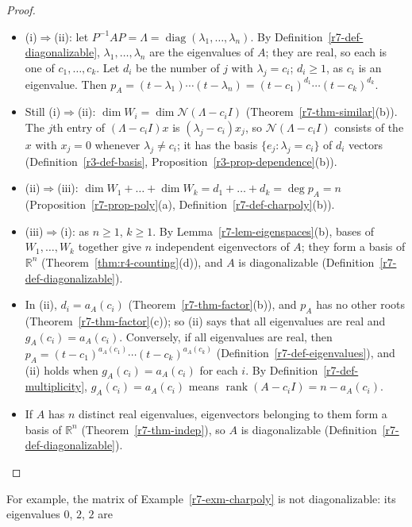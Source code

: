 \documentclass[12pt]{article}
\newcommand{\R}{\mathbb R}
\DeclareMathOperator{\diag}{diag}
\DeclareMathOperator{\rank}{rank}
\theoremstyle{definition}
\begin{document}
\begin{proof}
\begin{itemize}
\item (i)\(\Rightarrow\)(ii): let \(P^{-1}AP=\Lambda=\diag(\lambda_1,\dots,\lambda_n)\). By
Definition~\ref{r7-def-diagonalizable}, \(\lambda_1,\dots,\lambda_n\) are the eigenvalues of \(A\); they are real, so each is
one of \(c_1,\dots,c_k\). Let \(d_i\) be the number of \(j\) with \(\lambda_j=c_i\); \(d_i\geqslant1\), as \(c_i\) is an
eigenvalue. Then \(p_A=(t-\lambda_1)\cdots(t-\lambda_n)=(t-c_1)^{d_1}\cdots(t-c_k)^{d_k}\).
\item Still (i)\(\Rightarrow\)(ii): \(\dim W_i=\dim\mathcal N(\Lambda-c_iI)\) (Theorem~\ref{r7-thm-similar}(b)). The \(j\)th entry
of \((\Lambda-c_iI)x\) is \((\lambda_j-c_i)x_j\), so \(\mathcal N(\Lambda-c_iI)\) consists of the \(x\) with \(x_j=0\) whenever
\(\lambda_j\ne c_i\); it has the basis \(\{e_j:\lambda_j=c_i\}\) of \(d_i\) vectors (Definition~\ref{r3-def-basis},
Proposition~\ref{r3-prop-dependence}(b)).
\item (ii)\(\Rightarrow\)(iii): \(\dim W_1+\dots+\dim W_k=d_1+\dots+d_k=\deg p_A=n\) (Proposition~\ref{r7-prop-poly}(a),
Definition~\ref{r7-def-charpoly}(b)).
\item (iii)\(\Rightarrow\)(i): as \(n\geqslant1\), \(k\geqslant1\). By Lemma~\ref{r7-lem-eigenspaces}(b), bases of
\(W_1,\dots,W_k\) together give \(n\) independent eigenvectors of \(A\); they form a basis of \(\R^n\)
(Theorem~\ref{thm:r4-counting}(d)), and \(A\) is diagonalizable (Definition~\ref{r7-def-diagonalizable}).
\item In (ii), \(d_i=a_A(c_i)\) (Theorem~\ref{r7-thm-factor}(b)), and \(p_A\) has no other roots (Theorem~\ref{r7-thm-factor}(c)); so (ii) says that all
eigenvalues are real and \(g_A(c_i)=a_A(c_i)\). Conversely, if all eigenvalues are real, then
\(p_A=(t-c_1)^{a_A(c_1)}\cdots(t-c_k)^{a_A(c_k)}\) (Definition~\ref{r7-def-eigenvalues}), and (ii) holds when
\(g_A(c_i)=a_A(c_i)\) for each \(i\). By Definition~\ref{r7-def-multiplicity}, \(g_A(c_i)=a_A(c_i)\) means
\(\rank(A-c_iI)=n-a_A(c_i)\).
\item If \(A\) has \(n\) distinct real eigenvalues, eigenvectors belonging to them form a basis of \(\R^n\)
(Theorem~\ref{r7-thm-indep}), so \(A\) is diagonalizable (Definition~\ref{r7-def-diagonalizable}).\qedhere
\end{itemize}
\end{proof}
For example, the matrix of Example~\ref{r7-exm-charpoly} is not diagonalizable: its eigenvalues \(0\), \(2\), \(2\) are
\end{document}
